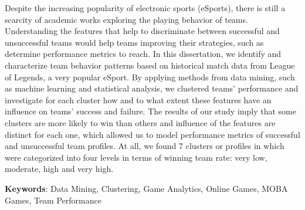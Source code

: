 Despite the increasing popularity of electronic sports (eSports), there is still a scarcity of academic works exploring the playing behavior of teams. Understanding the features that help to discriminate between successful and unsuccessful teams would help teams improving their strategies, such as determine performance metrics to reach. In this dissertation, we identify and characterize team behavior patterns based on historical match data from League of Legends, a very popular eSport. By applying methods from data mining, such as machine learning and statistical analysis, we clustered teams' performance and investigate for each cluster how and to what extent these features have an influence on teams' success and failure. The results of our study imply that some clusters are more likely to win than others and influence of the features are distinct for each one, which allowed us to model performance metrics of successful and unsuccessful team profiles. At all, we found 7 clusters or profiles in which were categorized into four levels in terms of winning team rate: very low, moderate, high and very high.

\textbf{Keywords}: Data Mining, Clustering, Game Analytics, Online Games, MOBA Games, Team Performance